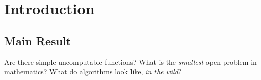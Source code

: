 \documentclass[a4paper,british]{article}
\theoremstyle{definition} %
\numberwithin{equation}{section}
\theoremstyle{definition} %
\newcommand{\BBtheFifth}{47{,}176{,}870}
\newcommand{\SigmaTheFifth}{4{,}098}
\newcommand{\radofull}{Tibor Rad\'o\xspace}
\newcommand{\rado}{Rad\'o\xspace}
\begin{document}

\vspace{-40pt}

\section{Introduction}\label{sec:intro}

\subsection{Main Result}\label{sec:intro:mainresults}

\newcommand{\noncomput}{uncomputable\xspace}
\newcommand{\BBfull}{Busy Beaver\xspace}
\newcommand{\Coq}{Coq\xspace}
\newcommand{\CoqProofReleaseURL}{\url{https://github.com/ccz181078/Coq-BB5}}

\newcommand{\ie}{i.e.~}
\newcommand{\eg}{e.g.~}

Are there simple \noncomput functions? What is the \textit{smallest} open problem in mathematics? What do algorithms look like, \textit{in the wild}?
\end{document}
